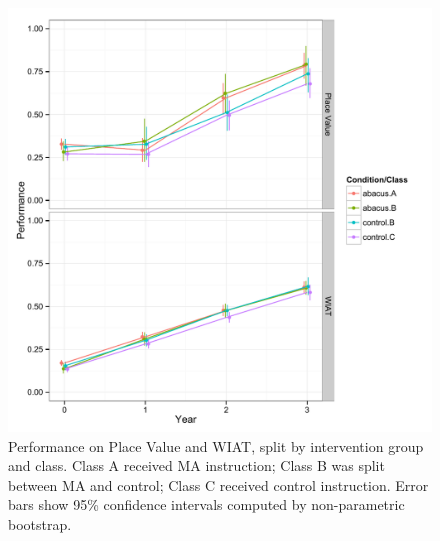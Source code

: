 \documentclass[11pt]{article}
\begin{document}
\begin{figure}[H]
\begin{center}
\includegraphics[width=5.5in]{figures/math2_class.pdf}
\end{center}
\caption{Performance on Place Value and WIAT, split by intervention group and class. Class A received MA instruction; Class B was split between MA and control; Class C received control instruction. Error bars show 95\% confidence intervals computed by non-parametric bootstrap.}
\label{fig:mathclass2}
\end{figure}
\end{document}
